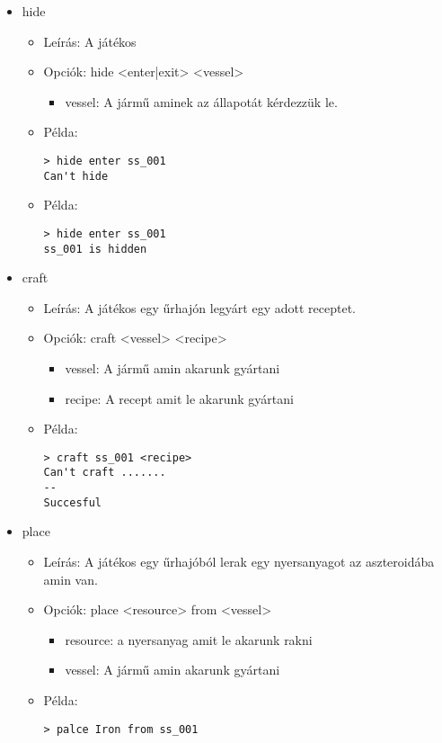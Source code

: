 \documentclass[../../projlab]{subfiles}
\begin{document}
\begin{itemize}
    \item hide
    \begin{itemize}
        \item Leírás: A játékos 
        \item Opciók: hide <enter|exit> <vessel>
        \begin{itemize}
            \item vessel: A jármű aminek az állapotát kérdezzük le.
        \end{itemize}
        \item Példa:
            \begin{verbatim}
> hide enter ss_001
Can't hide
            \end{verbatim}
        \item Példa:
            \begin{verbatim}
> hide enter ss_001
ss_001 is hidden
            \end{verbatim}            
    \end{itemize}


    \item craft
    \begin{itemize}
        \item Leírás: A játékos egy űrhajón legyárt egy adott receptet.
        \item Opciók: craft <vessel> <recipe>
        \begin{itemize}
            \item vessel: A jármű amin akarunk gyártani
            \item recipe: A recept amit le akarunk gyártani
        \end{itemize}
        \item Példa:
            \begin{verbatim}
> craft ss_001 <recipe>
Can't craft .......
--
Succesful
            \end{verbatim}
    \end{itemize}


    \item place
    \begin{itemize}
        \item Leírás: A játékos egy űrhajóból lerak egy nyersanyagot az aszteroidába amin van.
        \item Opciók: place <resource> from <vessel>
        \begin{itemize}
            \item resource: a nyersanyag amit le akarunk rakni
            \item vessel: A jármű amin akarunk gyártani
        \end{itemize}
        \item Példa:
            \begin{verbatim}
> palce Iron from ss_001
            \end{verbatim}
    \end{itemize}


\end{itemize}
\end{document}
